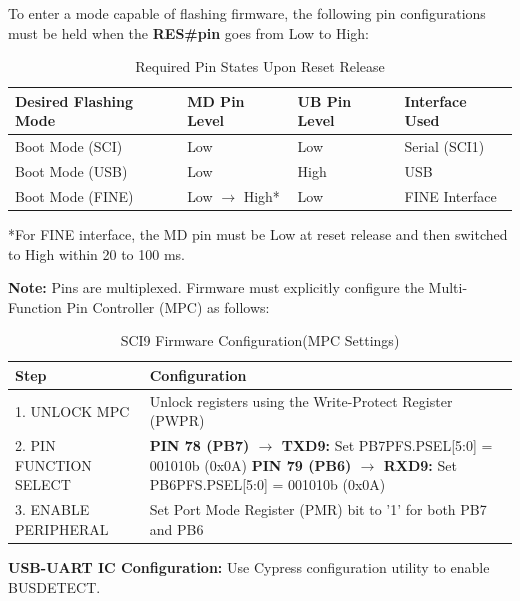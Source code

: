 \begin{table}[H]
\centering
\caption{Required Pin States Upon Reset Release}
\label{tab:reset-pin-states}
\small
To enter a mode capable of flashing firmware, the following pin configurations must be held when the \textbf{RES\#pin} goes from Low to High:

\vspace{0.2cm}

\begin{tabular}{|l|l|l|l|}
\hline
\textbf{Desired Flashing Mode} & \textbf{MD Pin Level} & \textbf{UB Pin Level} & \textbf{Interface Used} \\
\hline
Boot Mode (SCI) & Low & Low & Serial (SCI1) \\
\hline
Boot Mode (USB) & Low & High & USB \\
\hline
Boot Mode (FINE) & Low $\rightarrow$ High* & Low & FINE Interface \\
\hline
\end{tabular}

\vspace{0.2cm}

\small
*For FINE interface, the MD pin must be Low at reset release and then switched to High within 20 to 100 ms.
\end{table}

\begin{table}[H]
\centering
\caption{SCI9 Firmware Configuration(MPC Settings)}
\label{tab:sci9-config}
\small
\textbf{Note:} Pins are multiplexed. Firmware must explicitly configure the Multi-Function Pin Controller (MPC) as follows:

\vspace{0.2cm}

\begin{tabular}{
  | l | p{11cm} |}
\hline
\textbf{Step} & \textbf{Configuration} \\
\hline
1. UNLOCK MPC & Unlock registers using the Write-Protect Register (PWPR) \\
\hline
2. PIN FUNCTION SELECT & \textbf{PIN 78 (PB7) $\rightarrow$ TXD9:} Set PB7PFS.PSEL[5:0] = 001010b (0x0A) \newline \textbf{PIN 79 (PB6) $\rightarrow$ RXD9:} Set PB6PFS.PSEL[5:0] = 001010b (0x0A) \\
\hline
3. ENABLE PERIPHERAL & Set Port Mode Register (PMR) bit to '1' for both PB7 and PB6 \\
\hline
\end{tabular}

\vspace{0.2cm}

\small
\textbf{USB-UART IC Configuration:} Use Cypress configuration utility to enable BUSDETECT.
\end{table}


